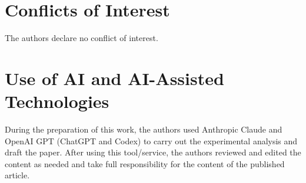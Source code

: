\documentclass[a4paper,11pt]{article}
\begin{document}
\section*{Conflicts of Interest}
The authors declare no conflict of interest.

\section*{Use of AI and AI-Assisted Technologies}
During the preparation of this work, the authors used Anthropic Claude and OpenAI GPT (ChatGPT and Codex) to carry out the experimental analysis and draft the paper. After using this tool/service, the authors reviewed and edited the content as needed and take full responsibility for the content of the published article.




% 
% 
\end{document}
